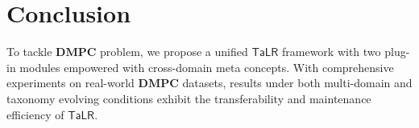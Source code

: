 \section{Conclusion}
To tackle $\mathbf{DMPC}$ problem,
we propose a unified $\mathsf{TaLR}$ framework with two plug-in modules empowered with cross-domain meta concepts.
With comprehensive experiments on real-world $\mathbf{DMPC}$ datasets, results under both multi-domain and taxonomy evolving conditions exhibit the transferability and maintenance efficiency of $\mathsf{TaLR}$.

